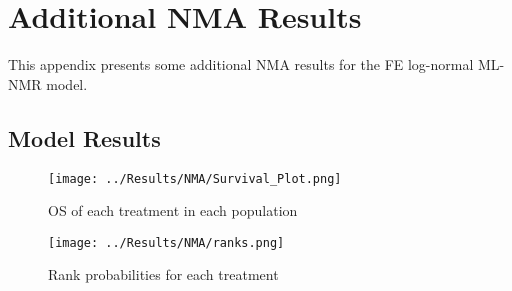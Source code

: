 \chapter{Additional NMA Results}\label{NMAAppendix}

This appendix presents some additional NMA results for the FE log-normal ML-NMR model. 

\section{Model Results}

\begin{figure}[h]
    \centering
    \texttt{[image: ../Results/NMA/Survival\_Plot.png]}
    \caption{OS of each treatment in each population}
    \label{fig:pred_survbc}
\end{figure}

\begin{figure}[h]
    \centering
    \texttt{[image: ../Results/NMA/ranks.png]}
    \caption{Rank probabilities for each treatment}
    \label{fig:rankplot}
\end{figure}

